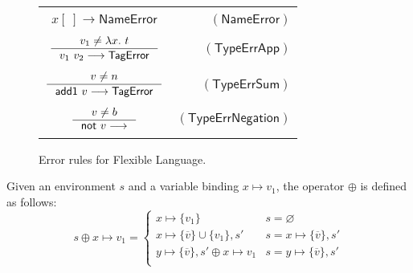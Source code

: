 \documentclass[preprint,authoryear,sort&compress,9pt,nocopyrightspace]{article}
\newcommand\rulename[1]{\mathsf{(#1)}}
\newcommand{\tto}{\longrightarrow}
\newcommand{\absST}[2]{\lambda #1. \ #2}
\newcommand{\negacion}[1]{\mathsf{not} \ #1}
\newcommand{\suma}[1]{\mathsf{add1} \ #1}
\newcommand{\nameerror}{\mathsf{NameError}}
\newcommand{\typeerror}{\mathsf{TagError}}
\newcommand{\semanticA}{Flexible Language}
\begin{document}
\begin{figure}[h]
\begin{small}
\begin{center}
\begin{tabular}{|c r|}
\hline
&\\
$x[ \ ] \tto \nameerror$&$\rulename{NameError}$\\
&\\
$\inference {v_1 \neq \absST {x}{t}}{v_1 \ v_2 \tto \typeerror}$&$\rulename{TypeErrApp}$\\
&\\
$\inference {v \neq n}{\suma{v} \tto \typeerror}$&$\rulename{TypeErrSum}$\\
&\\
$\inference {v \neq b}{\negacion{v} \tto  }$&$\rulename{TypeErrNegation}$\\
&\\
\hline
\end{tabular}
\caption{Error rules for \semanticA.}
\label{tabla:rules1errors}
\end{center}
\end{small}
\end{figure}


\begin{definition}[$\oplus$]
\label{definition:tcs}
\mbox{}
Given an environment  $s$ and a variable binding $x \mapsto v_1$, the operator $\oplus$ is defined  as follows:
\[ s \oplus x \mapsto v_1 = \begin{cases} 
      x \mapsto \{v_1\}& s =  \varnothing \\
      x \mapsto \{\overline{v}\} \cup \{v_1\}, s' & s = x \mapsto \{\overline{v }\}, s'\\
      y \mapsto \{\overline{v}\}, s' \oplus x \mapsto v_1 & s = y \mapsto \{\overline{v}\}, s'\\
   \end{cases}
\]
\end{definition}
\end{document}
